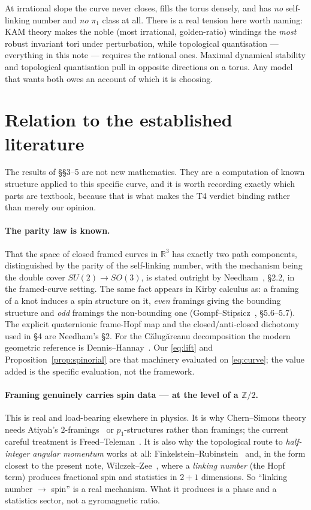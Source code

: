 \documentclass[11pt,a4paper]{article}
\begin{document}
At irrational slope the curve never closes, fills the torus densely, and
has \emph{no} self-linking number and \emph{no} $\pi_1$ class at all.
There is a real tension here worth naming: KAM theory makes the noble
(most irrational, golden-ratio) windings the \emph{most} robust invariant
tori under perturbation, while topological quantisation --- everything in
this note --- requires the rational ones.  Maximal dynamical stability
and topological quantisation pull in opposite directions on a torus.  Any
model that wants both owes an account of which it is choosing.

\section{Relation to the established literature}
\label{sec:lit}

The results of \S\S3--5 are not new mathematics.  They are a computation
of known structure applied to this specific curve, and it is worth
recording exactly which parts are textbook, because that is what makes
the T4 verdict binding rather than merely our opinion.

\paragraph{The parity law is known.}
That the space of closed framed curves in $\mathbb{R}^3$ has exactly two
path components, distinguished by the parity of the self-linking number,
with the mechanism being the double cover $SU(2)\to SO(3)$, is stated
outright by Needham~\cite{needham2017}, \S2.2, in the framed-curve
setting.  The same fact appears in Kirby calculus as: a framing of a knot
induces a spin structure on it, \emph{even} framings giving the bounding
structure and \emph{odd} framings the non-bounding one
(Gompf--Stipsicz~\cite{gompfstipsicz1999}, \S5.6--5.7).  The explicit
quaternionic frame-Hopf map and the closed/anti-closed dichotomy used in
\S4 are Needham's \S2.  For the C\u{a}lug\u{a}reanu decomposition the
modern geometric reference is Dennis--Hannay~\cite{dennishannay2005}.
Our \eqref{eq:lift} and Proposition~\ref{prop:spinorial} are that
machinery evaluated on \eqref{eq:curve}; the value added is the specific
evaluation, not the framework.

\paragraph{Framing genuinely carries spin data --- at the level of a
$\mathbb{Z}/2$.}
This is real and load-bearing elsewhere in physics.  It is why
Chern--Simons theory needs Atiyah's $2$-framings~\cite{atiyah1990} or
$p_1$-structures rather than framings; the current careful treatment is
Freed--Teleman~\cite{freedteleman2026}.  It is also why the topological
route to \emph{half-integer angular momentum} works at all:
Finkelstein--Rubinstein~\cite{finkelsteinrubinstein1968} and, in the form
closest to the present note, Wilczek--Zee~\cite{wilczekzee1983}, where a
\emph{linking number} (the Hopf term) produces fractional spin and
statistics in $2{+}1$ dimensions.  So ``linking number $\to$ spin'' is a
real mechanism.  What it produces is a phase and a statistics sector, not
a gyromagnetic ratio.
\end{document}
